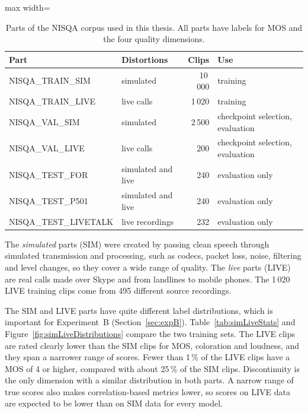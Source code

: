 \documentclass[
english,                 %
bibtex,                  %
includeExtraAbstracts, %
]{kththesis}
\numberwithin{listing}{chapter}
\begin{document}
\begin{table}[!ht]
  \centering
  \caption{Parts of the NISQA corpus used in this thesis. All parts have labels for MOS and the four quality dimensions.}
  \label{tab:nisqaSplits}
  \begin{adjustbox}{max width=\textwidth}
  \begin{tabular}{llrl}
    \toprule
    Part & Distortions & Clips & Use \\
    \midrule
    NISQA\_TRAIN\_SIM   & simulated & 10\,000 & training \\
    NISQA\_TRAIN\_LIVE  & live calls & 1\,020 & training \\
    NISQA\_VAL\_SIM     & simulated & 2\,500 & checkpoint selection, evaluation \\
    NISQA\_VAL\_LIVE    & live calls & 200 & checkpoint selection, evaluation \\
    NISQA\_TEST\_FOR      & simulated and live & 240 & evaluation only \\
    NISQA\_TEST\_P501     & simulated and live & 240 & evaluation only \\
    NISQA\_TEST\_LIVETALK & live recordings & 232 & evaluation only \\
    \bottomrule
  \end{tabular}
  \end{adjustbox}
\end{table}

The \emph{simulated} parts (SIM) were created by passing clean speech through simulated transmission and processing, such as codecs, packet loss, noise, filtering and level changes, so they cover a wide range of quality. The \emph{live} parts (LIVE) are real calls made over Skype and from landlines to mobile phones. The 1\,020 LIVE training clips come from 495 different source recordings.

The SIM and LIVE parts have quite different label distributions, which is important for Experiment~B (Section~\ref{sec:expB}). Table~\ref{tab:simLiveStats} and Figure~\ref{fig:simLiveDistributions} compare the two training sets. The LIVE clips are rated clearly lower than the SIM clips for MOS, coloration and loudness, and they span a narrower range of scores. Fewer than 1\,\% of the LIVE clips have a MOS of 4 or higher, compared with about 25\,\% of the SIM clips. Discontinuity is the only dimension with a similar distribution in both parts. A narrow range of true scores also makes correlation-based metrics lower, so scores on LIVE data are expected to be lower than on SIM data for every model.
\end{document}
